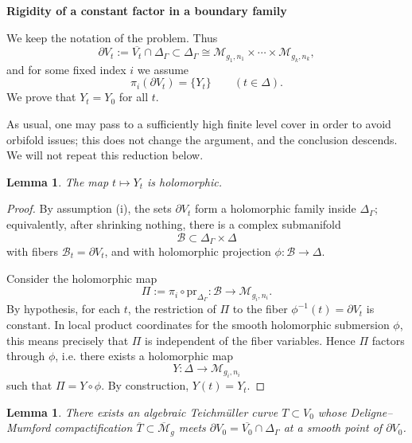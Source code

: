 \documentclass[11pt]{article}
\newtheorem{lemma}[theorem]{Lemma}
\begin{document}
\begin{center}
{\Large\bf Rigidity of a constant factor in a boundary family}
\end{center}

\medskip

We keep the notation of the problem.  Thus
\[
\partial V_t:=\overline{V_t}\cap \Delta_\Gamma\subset \Delta_\Gamma
\cong \mathcal M_{g_1,n_1}\times\cdots\times \mathcal M_{g_k,n_k},
\]
and for some fixed index $i$ we assume
\[
\pi_i(\partial V_t)=\{Y_t\}\qquad (t\in \Delta).
\]
We prove that $Y_t=Y_0$ for all $t$.

\medskip

As usual, one may pass to a sufficiently high finite level cover in order to avoid orbifold issues; this does not change the argument, and the conclusion descends.  We will not repeat this reduction below.

\begin{lemma}\label{lem:holomorphic-factor}
The map $t\mapsto Y_t$ is holomorphic.
\end{lemma}

\begin{proof}
By assumption \textup{(i)}, the sets $\partial V_t$ form a holomorphic family inside
$\Delta_\Gamma$; equivalently, after shrinking nothing, there is a complex submanifold
\[
\mathcal B\subset \Delta_\Gamma\times \Delta
\]
with fibers $\mathcal B_t=\partial V_t$, and with holomorphic projection
$\phi:\mathcal B\to \Delta$.

Consider the holomorphic map
\[
\Pi:=\pi_i\circ \mathrm{pr}_{\Delta_\Gamma}:\mathcal B\longrightarrow \mathcal M_{g_i,n_i}.
\]
By hypothesis, for each $t$, the restriction of $\Pi$ to the fiber
$\phi^{-1}(t)=\partial V_t$ is constant.  In local product coordinates for the smooth
holomorphic submersion $\phi$, this means precisely that $\Pi$ is independent of the
fiber variables.  Hence $\Pi$ factors through $\phi$, i.e. there exists a holomorphic
map
\[
Y:\Delta\longrightarrow \mathcal M_{g_i,n_i}
\]
such that $\Pi=Y\circ \phi$.  By construction, $Y(t)=Y_t$.
\end{proof}

\begin{lemma}\label{lem:teich-curve}
There exists an algebraic Teichm\"uller curve $T\subset V_0$ whose Deligne--Mumford
compactification $\overline{T}\subset \overline{\mathcal M}_g$ meets
$\partial V_0=\overline{V_0}\cap \Delta_\Gamma$ at a smooth point of $\partial V_0$.
\end{lemma}
\end{document}
